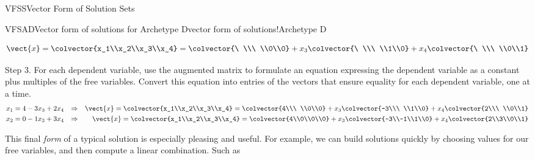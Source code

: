 \begin{subsect}{VFSS}{Vector Form of Solution Sets}
\begin{example}{VFSAD}{Vector form of solutions for Archetype D}{vector form of solutions!Archetype D}
\begin{para}
%
\begin{equation*}
\vect{x}=\colvector{x_1\\x_2\\x_3\\x_4}=
\colvector{\ \\\ \\0\\0}+x_3\colvector{\ \\\ \\1\\0}+x_4\colvector{\ \\\ \\0\\1}
\end{equation*}
\end{para}
%
\begin{para}Step 3.  For each dependent variable, use the augmented matrix to formulate an equation expressing the dependent variable as a constant plus multiples of the free variables.  Convert this equation into entries of the vectors that ensure equality for each dependent variable, one at a time.
%
\begin{align*}
x_1=4-3x_3+2x_4&&\Rightarrow&&
\vect{x}=\colvector{x_1\\x_2\\x_3\\x_4}=
\colvector{4\\\ \\0\\0}+x_3\colvector{-3\\\ \\1\\0}+x_4\colvector{2\\\ \\0\\1}\\
%
x_2=0-1x_3+3x_4&&\Rightarrow&&
\vect{x}=\colvector{x_1\\x_2\\x_3\\x_4}=
\colvector{4\\0\\0\\0}+x_3\colvector{-3\\-1\\1\\0}+x_4\colvector{2\\3\\0\\1}
\end{align*}\end{para}
%
\begin{para}This final {\em form} of a typical solution is especially pleasing and useful.  For example, we can build solutions quickly by choosing values for our free variables, and then compute a linear combination.  Such as

\end{para}
\end{example}
\end{subsect}
